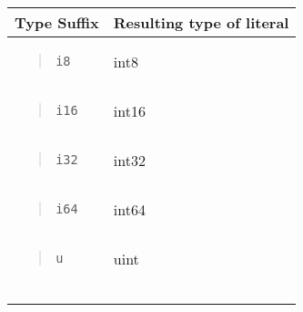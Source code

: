 \begin{longtable}[]{@{}ll@{}}
\toprule
Type Suffix & Resulting type of literal\tabularnewline
\midrule
\endhead
\begin{minipage}[t]{0.47\columnwidth}\raggedright
\begin{quote}
\texttt{\textquotesingle{}i8}
\end{quote}\strut
\end{minipage} & \begin{minipage}[t]{0.47\columnwidth}\raggedright
int8\strut
\end{minipage}\tabularnewline
\begin{minipage}[t]{0.47\columnwidth}\raggedright
\begin{quote}
\texttt{\textquotesingle{}i16}
\end{quote}\strut
\end{minipage} & \begin{minipage}[t]{0.47\columnwidth}\raggedright
int16\strut
\end{minipage}\tabularnewline
\begin{minipage}[t]{0.47\columnwidth}\raggedright
\begin{quote}
\texttt{\textquotesingle{}i32}
\end{quote}\strut
\end{minipage} & \begin{minipage}[t]{0.47\columnwidth}\raggedright
int32\strut
\end{minipage}\tabularnewline
\begin{minipage}[t]{0.47\columnwidth}\raggedright
\begin{quote}
\texttt{\textquotesingle{}i64}
\end{quote}\strut
\end{minipage} & \begin{minipage}[t]{0.47\columnwidth}\raggedright
int64\strut
\end{minipage}\tabularnewline
\begin{minipage}[t]{0.47\columnwidth}\raggedright
\begin{quote}
\texttt{\textquotesingle{}u}
\end{quote}\strut
\end{minipage} & \begin{minipage}[t]{0.47\columnwidth}\raggedright
uint\strut
\end{minipage}\tabularnewline
\begin{minipage}[t]{0.47\columnwidth}\raggedright
\begin{quote}

\end{quote}
\end{minipage}
\end{longtable}
